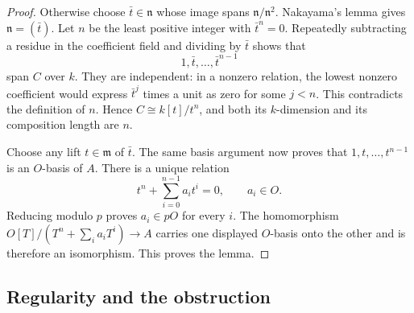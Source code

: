 \begin{proof}
Otherwise choose $\bar t\in\mathfrak n$ whose image spans
$\mathfrak n/\mathfrak n^2$.  Nakayama's lemma gives
$\mathfrak n=(\bar t)$.  Let $n$ be the least positive
integer with $\bar t^n=0$.  Repeatedly subtracting a residue
in the coefficient field and dividing by $\bar t$ shows that
\[
 1,\bar t,\ldots,\bar t^{n-1}
\]
span $C$ over $k$.  They are independent: in a nonzero
relation, the lowest nonzero coefficient would express
$\bar t^j$ times a unit as zero for some $j<n$.  This
contradicts the definition of $n$.  Hence
$C\cong k[t]/t^n$, and both its $k$-dimension and its
composition length are $n$.

Choose any lift $t\in\mathfrak m$ of $\bar t$.  The same
basis argument now proves that $1,t,\ldots,t^{n-1}$ is an
$O$-basis of $A$.  There is a unique relation
\[
 t^n+\sum_{i=0}^{n-1}a_it^i=0,\qquad a_i\in O.
\]
Reducing modulo $p$ proves $a_i\in pO$ for every $i$.
The homomorphism $O[T]/(T^n+\sum_i a_iT^i)\to A$ carries
one displayed $O$-basis onto the other and is therefore an
isomorphism.  This proves the lemma.
\end{proof}

\subsection{Regularity and the obstruction}


